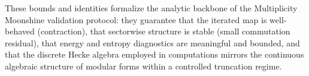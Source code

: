 \documentclass[11pt]{article}
\theoremstyle{definition}
\theoremstyle{plain}
\theoremstyle{remark}
\begin{document}
These bounds and identities formalize the analytic backbone of the Multiplicity Moonshine validation protocol: they guarantee that the iterated map is well-behaved (contraction), that sectorwise structure is stable (small commutation residual), that energy and entropy diagnostics are meaningful and bounded, and that the discrete Hecke algebra employed in computations mirrors the continuous algebraic structure of modular forms within a controlled truncation regime.

\nocite{*}


\end{document}
